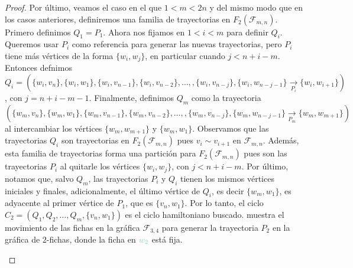 \begin{proof}
Por \'ultimo, veamos el caso en el que $1<m<2n$ y del mismo modo que en los
casos anteriores, definiremos una familia de trayectorias en
$F_2(\mathcal{F}_{m,n})$. Primero definimos $Q_1 =P_1$. Ahora nos fijamos en
$1<i<m$ para definir $Q_i$. Queremos usar $P_i$ como referencia para generar las
nuevas trayectorias, pero $P_i$ tiene m\'as v\'ertices de la forma
$\{w_i,w_j\}$, en particular cuando $j< n+i-m$. Entonces defnimos $Q_i =
(\{w_i,v_n\},\{w_i,w_1\},\{w_i,v_{n-1}\},\{w_i,v_{n-2}\}, \dots,
,\{w_i,v_{n-j}\},\{w_i,w_{n-j-1}\}\xrightarrow[P_i]{}\{w_i,w_{i+1}\})$, con $j =
n+i-m-1$. Finalmente, definimos $Q_m$ como la trayectoria
$(\{w_m,v_n\},\{w_m,w_1\},\{w_m,v_{n-1}\},\{w_m,v_{n-2}\}, \dots,
,\{w_m,v_{n-j}\},\{w_m,w_{n-j-1}\}\xrightarrow[P_m]{}\{w_m,w_{m+1}\})$ al
intercambiar los v\'ertices $\{w_m,w_{m+1}\}$ y $\{w_m,w_1\}$. Observamos que
las trayectorias $Q_i$ son trayectorias en $F_2(\mathcal{F}_{m,n})$ pues $v_i
\sim v_{i+1}$ en $\mathcal{F}_{m,n}$. Adem\'as, esta familia de trayectorias
forma una partici\'on para $F_2(\mathcal{F}_{m,n})$ pues son las trayectorias
$P_i$ al quitarle los v\'ertices $\{w_i,w_j\}$, con $j< n+i-m$. Por \'ultimo,
notamos que, salvo $Q_m$, las trayectorias $P_i$ y $Q_i$ tienen los mismos
v\'ertices iniciales y finales, adicionalmente, el \'ultimo v\'ertice de $Q_i$,
es decir $\{w_m,w_1\}$, es adyacente al primer v\'ertice de $P_1$, que es
$\{v_n,w_1\}$. Por lo tanto, el ciclo $C_2=(Q_1,Q_2, \dots, Q_m, \{v_n,w_1\})$ es
el ciclo hamiltoniano buscado.  muestra el
movimiento de las fichas en la gr\'afica $\mathcal{F}_{3,4}$ para generar la
trayectoria $P_2$ en la gr\'afica de $2$-fichas, donde la ficha en
${\color{azulClaro}w_2}$ est\'a fija.


\begin{figure}[ht!]
    \centering
\end{figure}
\end{proof}
